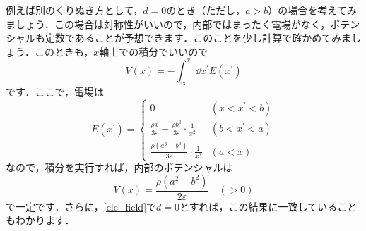 \documentclass[a4paper,pdflatex,ja=standard]{bxjsarticle}
\begin{document}
例えば別のくりぬき方として，$d=0$のとき（ただし，$a>b$）の場合を考えてみましょう．この場合は対称性がいいので，内部ではまったく電場がなく，ポテンシャルも定数であることが予想できます．このことを少し計算で確かめてみましょう．このときも，$x$軸上での積分でいいので
\begin{equation}
  V(x)
  =
  -\int_{\infty}^{x}\dd x^{\prime} E(x^{\prime})
\end{equation}
です．ここで，電場は
\begin{equation}
  E(x^{\prime})
  =
  \left\{
    \begin{alignedat}{1}
      0
      & (x < x^{\prime} < b)
      \\
      \frac{\rho x}{3\varepsilon}
      -
      \frac{\rho b^3}{3\varepsilon}\cdot\frac{1}{x^2}
      & (b < x^{\prime} < a)
      \\
      \frac{\rho (a^3-b^3)}{3\varepsilon} \cdot\frac{1}{x^2}
      & (a < x)
    \end{alignedat}
  \right.
\end{equation}
なので，積分を実行すれば，内部のポテンシャルは
\begin{equation}
  V(x)
  =
  \frac{\rho(a^2-b^2)}{2\varepsilon}
  \quad
  (>0)
\end{equation}
で一定です．さらに，\eqref{ele_field}で$d=0$とすれば，この結果に一致していることもわかります．
\end{document}
